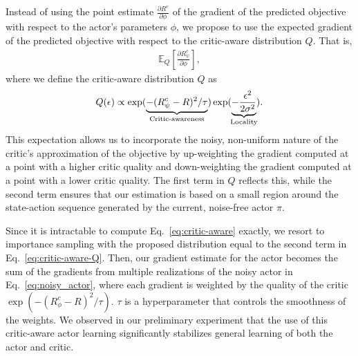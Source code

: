 Instead of using the point estimate $\frac{\partial R^c}{\partial \phi}$ of the gradient of the predicted objective with respect to the actor's parameters $\phi$, we propose to use the expected gradient of the predicted objective with respect to the critic-aware distribution $Q$. That is,
\begin{align}
\label{eq:critic-aware}
\mathbb{E}_{Q}\left[\frac{\partial R^c_{\psi}}{\partial \phi}\right],
\end{align}
where we define the critic-aware distribution $Q$ as 
\begin{align}
\label{eq:critic-aware-Q}
    Q(\epsilon) \propto \exp(\underbrace{
    -(R^c_{\psi} - R)^2/\tau}_{\text{Critic-awareness}}
    )\exp(\underbrace{-\frac{\epsilon^2}{2\sigma^2}}_{\mathclap{\text{Locality}}}).
\end{align}
This expectation allows us to incorporate the noisy, non-uniform nature of the critic's approximation of the objective by up-weighting the gradient computed at a point with a higher critic quality and down-weighting the gradient computed at a point with a lower critic quality. The first term in $Q$ reflects this, while the second term ensures that our estimation is based on a small region around the state-action sequence generated by the current, noise-free actor $\pi$. 

Since it is intractable to compute Eq.~\eqref{eq:critic-aware} exactly, we resort to importance sampling with the proposed distribution equal to the second term in Eq.~\eqref{eq:critic-aware-Q}. Then, our gradient estimate for the actor becomes the sum of the gradients from multiple realizations of the noisy actor in Eq.~\eqref{eq:noisy_actor}, where each gradient is weighted by the quality of the critic $\exp(-(R^c_{\phi} - R)^2 /\tau)$. $\tau$ is a hyperparameter that controls the smoothness of the weights. We observed in our preliminary experiment that the use of this critic-aware actor learning significantly stabilizes general learning of both the actor and critic.







